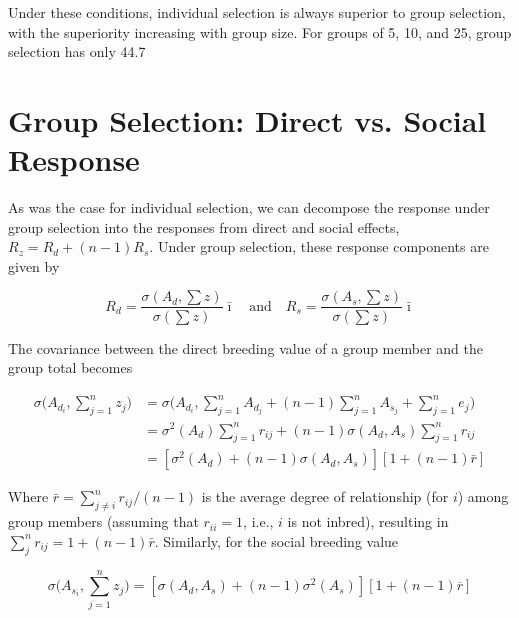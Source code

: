 \documentclass{article}
\begin{document}
Under these conditions, individual selection is always superior to group selection, with the superiority increasing with group size. For groups of 5, 10, and 25, group selection has only 44.7%

\section{Group Selection: Direct vs. Social Response}
As was the case for individual selection, we can decompose the response under group selection into the responses from direct and social effects,  $ R_{z} = R_{d} + (n - 1) R_{s} $. Under group selection, these response components are given by

\begin{equation}
R_{d}=\frac{\sigma(A_{d},\sum z)}{\sigma(\sum z)}\bar{\imath}\quad\mathrm{a n d}\quad R_{s}=\frac{\sigma(A_{s},\sum z)}{\sigma(\sum z)}\bar{\imath}
\tag{22.27a}
\label{eq:22_27a}
\end{equation}

The covariance between the direct breeding value of a group member and the group total becomes

\begin{equation}
\begin{align*}\sigma\bigg(A_{d_{i}},\sum_{j=1}^{n}z_{j}\bigg)&=\sigma\bigg(A_{d_{i}},\sum_{j=1}^{n}A_{d_{j}}+(n-1)\sum_{j=1}^{n}A_{s_{j}}+\sum_{j=1}^{n}e_{j}\bigg)\\&=\sigma^{2}(A_{d})\sum_{j=1}^{n}r_{ij}+(n-1)\sigma(A_{d},A_{s})\sum_{j=1}^{n}r_{ij}\\&=\left[\sigma^{2}(A_{d})+(n-1)\sigma(A_{d},A_{s})\right]\left[1+(n-1)\bar{r}\right]\end{align*}
\tag{22.27b}
\label{eq:22_27b}
\end{equation}

Where  $ \bar{r} = \sum_{j \neq i}^n r_{ij} / (n - 1) $ is the average degree of relationship (for  $ i $) among group members (assuming that  $ r_{ii} = 1 $, i.e.,  $ i $ is not inbred), resulting in  $ \sum_j^n r_{ij} = 1 + (n - 1)\bar{r} $. Similarly, for the social breeding value

\begin{equation}
\sigma\Bigg(A_{s_{i}},\sum_{j=1}^{n}z_{j}\Bigg)=\left[\sigma(A_{d},A_{s})+(n-1)\sigma^{2}(A_{s})\right]\left[1+(n-1)\overline{r}\right]
\tag{22.27c}
\label{eq:22_27c}
\end{equation}
\end{document}
